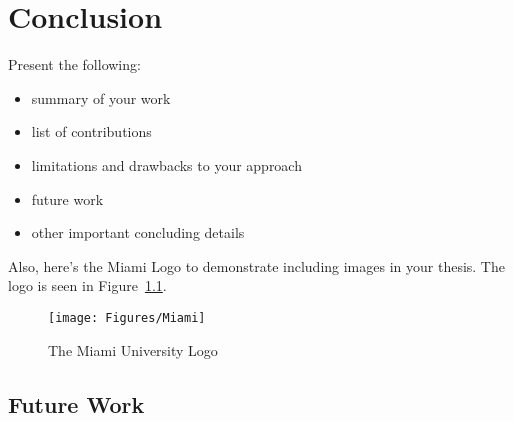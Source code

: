 \chapter{Conclusion}

Present the following:

\begin{itemize}
    \item summary of your work
    \item list of contributions
    \item limitations and drawbacks to your approach
    \item future work
    \item other important concluding details
\end{itemize}

Also, here's the Miami Logo to demonstrate including images in your thesis.
The logo is seen in Figure~\ref{fig:MiamiLogo}.

\begin{figure}[h]
    \centering
    \texttt{[image: Figures/Miami]}
    \caption{The Miami University Logo}
    \label{fig:MiamiLogo}
\end{figure}

\section{Future Work}
